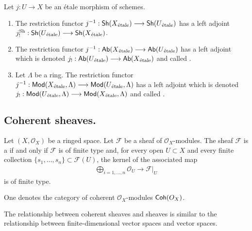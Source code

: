 \documentclass [11 pt, oneside] {article}
\begin{document}
\begin{definition}\label{}\text{}
Let $j:U\longrightarrow X$ be an \'etale morphism of schemes.
\begin{enumerate}
	\item The restriction functor $j^{-1} :\textsf{Sh}(X\textsubscript{\'etale})  \longrightarrow \textsf{Sh}(U\textsubscript{\'etale})$ has a left adjoint $j_!^{\textrm{Sh}} : \textsf{Sh}(U\textsubscript{\'etale}) \longrightarrow \textsf{Sh}(X\textsubscript{\'etale})$.
	\item The restriction functor $j^{-1} : \textsf{Ab}(X\textsubscript{\'etale}) \longrightarrow \textsf{Ab}(U\textsubscript{\'etale})$ has a left adjoint which is denoted $j_! : \textsf{Ab}(U\textsubscript{\'etale}) \longrightarrow \textsf{Ab}(X\textsubscript{\'etale})$ and called .
	\item Let $\Lambda$ be a ring. The restriction functor $j^{-1} : \textsf{Mod}(X\textsubscript{\'etale}, \Lambda)  \longrightarrow \textsf{Mod}(U\textsubscript{\'etale}, \Lambda)$ has a left adjoint which is denoted $j_! : \textsf{Mod}(U\textsubscript{\'etale}, \Lambda) \longrightarrow \textsf{Mod}(X\textsubscript{\'etale}, \Lambda)$ and called .
\end{enumerate}
\end{definition}

\subsection{Coherent sheaves.}
\begin{definition}\label{cohs}\text{}
Let $(X,\mathscr{O}_X)$ be a ringed space. Let $\mathscr{F}$ be a sheaf of $\mathscr{O}_X$-modules. The sheaf $\mathscr{F}$ is a  if and only if $\mathscr{F}$ is of finite type and, for every open $U\subset X$ and every finite collection $\{s_1,\hdots,s_n\}\subset \mathscr{F}(U)$, the kernel of the associated map
\begin{align*}
	\bigoplus_{i=1,\hdots, n}\mathscr{O}_U \longrightarrow \mathscr{F}\big |_U
\end{align*}
is of finite type.

One denotes the category of coherent $\mathscr{O}_X$-modules $\textsf{Coh}(\relax{O}_X)$.
\end{definition}

The relationship between coherent sheaves and sheaves is similar to the relationship between finite-dimensional vector spaces and vector spaces.
\end{document}
